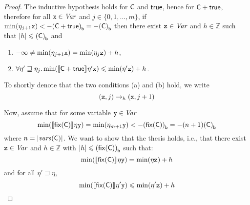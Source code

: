 \begin{proof}
  The inductive hypothesis holds for \(\com\) and \(\tru\), hence for
  \(\com \ndet \tru\), therefore for all \(\var \in \Var\) and
  \(j \in \{0,1, \ldots, m\}\), if
  \(\min(\eta_{j+1} \var) < -\lbound{\com\ndet \tru} = -\lbound{\com}\)
  then there exist \(\var[z] \in \Var\) and \(h \in \mathbb{Z}\) such
  that \(|h| \leq \lbound{\com}\) and
  \begin{enumerate}[label=(\alph*)]
  \item \(-\infty \neq \min(\eta_{j+1} \var) = \min(\eta_j \var[z]) + h\),
  \item \(\forall \eta' \sqsupseteq \eta_j.
    \min(\semi{\com \ndet \tru}\eta'\var) \leq \min(\eta' \var[z]) + h\).
  \end{enumerate}
  To shortly denote that the two conditions (a) and (b) hold, we write
  \[
  (\var[z],j) \to_{h} (\var, j+1)
  \]
  
  Now, assume that for some variable \(\var[y] \in \Var\)
  \[\min(\semi{\fix{\com}} \eta \var[y]) = \min(\eta_{m+1} \var[y]) <
    - \lbound{\fix{\com}} = - (n+1) \lbound{\com}\] where
  \(n=|\mathit{vars}(\com)|\).  We want to show that the thesis holds,
  i.e., that there exist \(\var[z] \in \Var\) and \(h \in \mathbb{Z}\)
  with \(|h| \leq \lbound{\fix{\com}}\) such that:
  \begin{equation}\label{eq:maxendmaxstartmin}
    \min(\semi{\fix{\com}} \eta \var[y]) = \min(\eta \var[z]) + h
  \end{equation}
  and for all \(\eta' \sqsupseteq \eta\),
  \begin{equation}\label{eq:maxmiddlemaxendmin}
    \min(\semi{\fix{\com}} \eta' \var[y]) \leq \min(\eta' \var[z]) + h
  \end{equation}
  

\end{proof}
